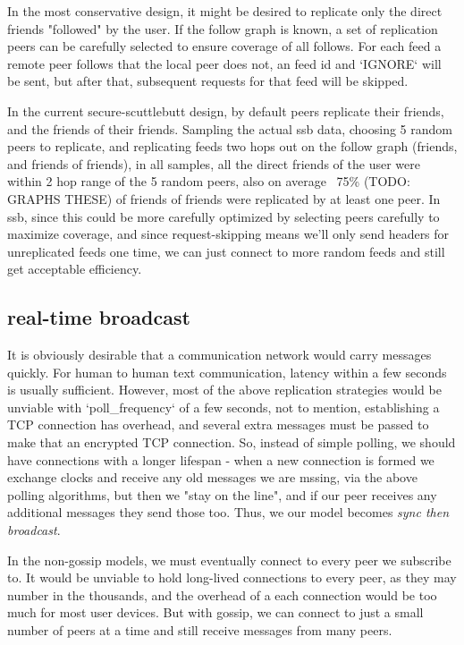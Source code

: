 \documentclass[sigconf]{acmart}
\begin{document}
In the most conservative design, it might be desired to replicate only
the direct friends "followed" by the user. If the follow graph is
known, a set of replication peers can be carefully selected to ensure
coverage of all follows. For each feed a remote peer follows that the
local peer does not, an feed id and `IGNORE` will be sent, but after
that, subsequent requests for that feed will be skipped.

In the current secure-scuttlebutt design, by default peers replicate
their friends, and the friends of their friends. Sampling the actual
ssb data, choosing 5 random peers to replicate, and replicating feeds
two hops out on the follow graph (friends, and friends of friends), in
all samples, all the direct friends of the user were within 2 hop
range of the 5 random peers, also on average ~75\% (TODO: GRAPHS THESE)
of friends of friends were replicated by at least one peer. In ssb,
since this could be more carefully optimized by selecting peers
carefully to maximize coverage, and since request-skipping means we'll
only send headers for unreplicated feeds one time, we can just connect
to more random feeds and still get acceptable efficiency.

\subsection{real-time broadcast}

It is obviously desirable that a communication network would carry
messages quickly. For human to human text communication, latency
within a few seconds is usually sufficient. However, most of the above
replication strategies would be unviable with `poll\_frequency` of a
few seconds, not to mention, establishing a TCP connection has
overhead, and several extra messages must be passed to make that an
encrypted TCP connection. So, instead of simple polling, we should
have connections with a longer lifespan - when a new connection is
formed we exchange clocks and receive any old messages we are mssing,
via the above polling algorithms, but then we "stay on the line", and
if our peer receives any additional messages they send those too.
Thus, we our model becomes {\em sync then broadcast}.

In the non-gossip models, we must eventually connect to every peer we
subscribe to. It would be unviable to hold long-lived connections to
every peer, as they may number in the thousands, and the overhead of a
each connection would be too much for most user devices. But with
gossip, we can connect to just a small number of peers at a time and
still receive messages from many peers.
\end{document}
